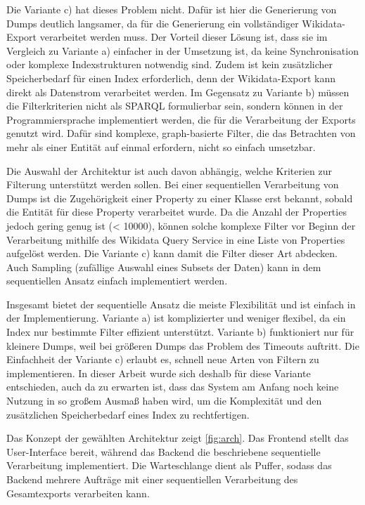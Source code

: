Die Variante c) hat dieses Problem nicht.
Dafür ist hier die Generierung von Dumps deutlich langsamer, da für die Generierung ein vollständiger Wikidata-Export verarbeitet werden muss.
Der Vorteil dieser Lösung ist, dass sie im Vergleich zu Variante a) einfacher in der Umsetzung ist, da keine Synchronisation oder komplexe Indexstrukturen notwendig sind.
Zudem ist kein zusätzlicher Speicherbedarf für einen Index erforderlich, denn der Wikidata-Export kann direkt als Datenstrom verarbeitet werden.
Im Gegensatz zu Variante b) müssen die Filterkriterien nicht als SPARQL formulierbar sein, sondern können in der Programmiersprache implementiert werden, die für die Verarbeitung der Exports genutzt wird.
Dafür sind komplexe, graph-basierte Filter, die das Betrachten von mehr als einer Entität auf einmal erfordern, nicht so einfach umsetzbar.

Die Auswahl der Architektur ist auch davon abhängig, welche Kriterien zur Filterung unterstützt werden sollen.
Bei einer sequentiellen Verarbeitung von Dumps ist die Zugehörigkeit einer Property zu einer Klasse erst bekannt, sobald die Entität für diese Property verarbeitet wurde.
Da die Anzahl der Properties jedoch gering genug ist (< 10000), können solche komplexe Filter vor Beginn der Verarbeitung mithilfe des Wikidata Query Service in eine Liste von Properties aufgelöst werden.
Die Variante c) kann damit die Filter dieser Art abdecken.
Auch Sampling (zufällige Auswahl eines Subsets der Daten) kann in dem sequentiellen Ansatz einfach implementiert werden.

Insgesamt bietet der sequentielle Ansatz die meiste Flexibilität und ist einfach in der Implementierung.
Variante a) ist komplizierter und weniger flexibel, da ein Index nur bestimmte Filter effizient unterstützt.
Variante b) funktioniert nur für kleinere Dumps, weil bei größeren Dumps das Problem des Timeouts auftritt.
Die Einfachheit der Variante c) erlaubt es, schnell neue Arten von Filtern zu implementieren.
In dieser Arbeit wurde sich deshalb für diese Variante entschieden, auch da zu erwarten ist, dass das System am Anfang noch keine Nutzung in so großem Ausmaß haben wird, um die Komplexität und den zusätzlichen Speicherbedarf eines Index zu rechtfertigen.

Das Konzept der gewählten Architektur zeigt \cref{fig:arch}.
Das Frontend stellt das User-Interface bereit, während das Backend die beschriebene sequentielle Verarbeitung implementiert.
Die Warteschlange dient als Puffer, sodass das Backend mehrere Aufträge mit einer sequentiellen Verarbeitung des Gesamtexports verarbeiten kann.

